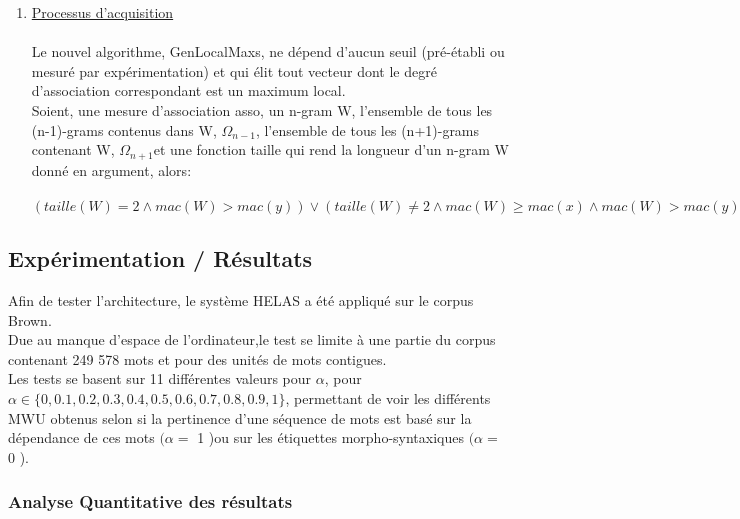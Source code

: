 \documentclass[a4paper,12pt]{article}
\begin{document}
\begin{enumerate}
\item \underline{Processus d'acquisition }\\ \\
Le nouvel algorithme,  GenLocalMaxs, ne d\'epend d'aucun seuil (pr\'e-\'etabli ou mesur\'e par exp\'erimentation) et qui \'elit tout vecteur dont le degr\'e d'association correspondant est un maximum local. \\ Soient, une mesure d'association asso, un n-gram W, l'ensemble de tous les (n-1)-grams contenus dans W, $ \Omega_{n-1}$, l'ensemble de tous les (n+1)-grams contenant W, $\Omega_{n+1} $et une fonction taille qui rend la longueur d'un n-gram W donn\'e en argument, alors: \\
 \\
$(taille(W) = 2 \land mac(W) > mac(y) ) \lor (taille(W) \neq 2 \land mac(W) \geq mac(x) \land mac(W) > mac(y)) $ 
\end{enumerate}
 
    \subsection{Exp\'erimentation / R\'esultats}
    
    Afin de tester l'architecture, le syst\`{e}me HELAS a \'{e}t\'{e} appliqu\'{e} sur le corpus Brown.\\
Due au manque d'espace de l'ordinateur,le test se limite \`a une partie du corpus contenant 249 578 mots et pour des unit\'es de mots contigues. \\
Les tests se basent sur 11 diff\'erentes valeurs pour $\alpha $, pour $ \alpha \in \{ 0, 0.1, 0.2, 0.3, 0.4, 0.5, 0.6, 0.7, 0.8, 0.9, 1\} $, permettant de voir les diff\'erents MWU obtenus selon si la pertinence d'une s\'equence de mots est bas\'e sur la d\'{e}pendance de ces mots $ ( \alpha = $ 1  )ou sur les \'etiquettes morpho-syntaxiques $ ( \alpha = $ 0  ).

    
    \subsubsection{Analyse Quantitative des r\'esultats}
    
\end{document}
